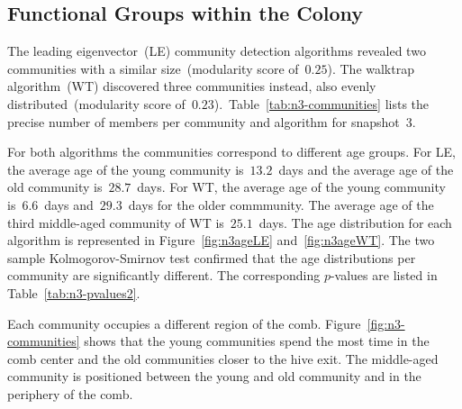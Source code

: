 \subsection{Functional Groups within the Colony}

The leading eigenvector~(LE) community detection algorithms revealed two communities with a similar size~(modularity score of~$0.25$).
The walktrap algorithm~(WT) discovered three communities instead, also evenly distributed~(modularity score of~$0.23$).~Table~\ref{tab:n3-communities} lists the precise number of members per community and algorithm for snapshot~3.

For both algorithms the communities correspond to different age groups.
For LE, the average age of the young community is~$13.2$~days and the average age of  the old community is~$28.7$~days.
For WT, the average age of the young community is~$6.6$~days and~$29.3$~days for the older commmunity.
The average age of the third middle-aged community of WT is~$25.1$~days.
The age distribution for each algorithm is represented in Figure~\ref{fig:n3ageLE} and~\ref{fig:n3ageWT}.
The two sample Kolmogorov-Smirnov test confirmed that the age distributions per community are significantly different.
The corresponding $p$-values are listed in Table~\ref{tab:n3-pvalues2}.

Each community occupies a different region of the comb.
Figure~\ref{fig:n3-communities} shows that the young communities spend the most time in the comb center and the old communities closer to the hive exit. The middle-aged community is positioned between the young and old community and in the periphery of the comb.




